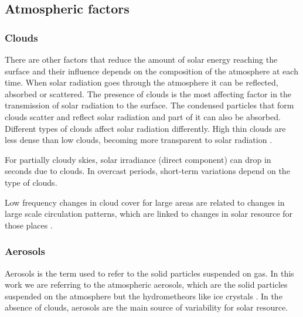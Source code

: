 \subsection{Atmospheric factors}

\subsubsection{Clouds}

There are other factors that reduce the amount of solar energy reaching the surface and their influence depends on the composition of the atmosphere at each time. When solar radiation goes through the atmosphere it can be reflected, absorbed or scattered. The presence of clouds is the most affecting factor in the transmission of solar radiation to the surface. The condensed particles that form clouds scatter and reflect solar radiation and part of it can also be absorbed. Different types of clouds affect solar radiation differently\cite*{Page2012}. High thin clouds are less dense than low clouds, becoming more transparent to solar radiation \cite*{Kasten1980}. %

For partially cloudy skies, solar irradiance (direct component) can drop in seconds \cite*{Page2012} due to clouds. In overcast periods, short-term variations depend on the type of clouds.

Low frequency changes in cloud cover for large areas are related to changes in large scale circulation patterns, which are linked to changes in solar resource for those places \cite*{Chiacchio2010, Sanchez-Lorenzo2009}.

\subsubsection{Aerosols}

Aerosols is the term used to refer to the solid particles suspended on gas. In this work we are referring to the atmospheric aerosols, which are the solid particles suspended on the atmosphere but the hydrometheors like ice crystals \cite*{boucher2015}. In the absence of clouds, aerosols are the main source of variability for solar resource. 

